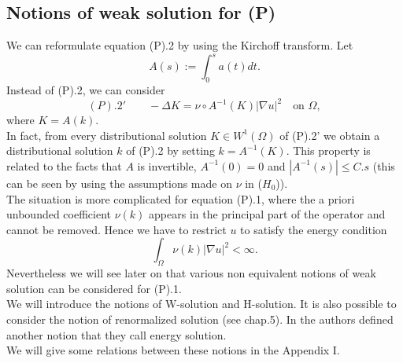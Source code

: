\documentclass{elsart}
\begin{document}
\subsection{Notions of weak solution for (P)}

We can reformulate equation (P).2 by using the Kirchoff
transform. Let 
$$A(s):=\int_0^s a(t)dt.$$
Instead of (P).2, we can consider 
$$(P).2' \qquad -\Delta K = \nu \circ A^{-1}(K)|\nabla u|^2 \quad
\text{on } \Omega,$$
where $K=A(k)$. \\ 
In fact, from every distributional solution $K \in W^1(\Omega)$ of (P).2' we
obtain a distributional solution $k$ of (P).2 by setting
$k=A^{-1}(K)$. This property is related to the facts that $A$ is invertible, $A^{-1}(0)=0$ and 
$|A^{-1}(s)| \leq C.s$ (this can be seen by using the assumptions made
on $\nu$ in ($H_0$)). \\ 

The situation is more complicated for equation (P).1, where the a
priori unbounded coefficient $\nu(k)$ appears in the principal part of
the operator and cannot be removed. Hence we have to restrict $u$ to
satisfy the energy condition 
\begin{equation} 
\int_{\Omega} \nu(k)|\nabla u|^2 < \infty. \label{0.1}
\end{equation}
Nevertheless we will see later on that various non equivalent notions
of weak solution can be considered for (P).1. \\ 
We will introduce the notions of W-solution and H-solution. It is
also possible to consider the notion of renormalized solution
(see \cite{lewan} chap.5). In \cite{gal} the authors defined another notion that they
call energy solution. \\ 
We will give some relations between these notions in the Appendix I. \\ 
\end{document}
